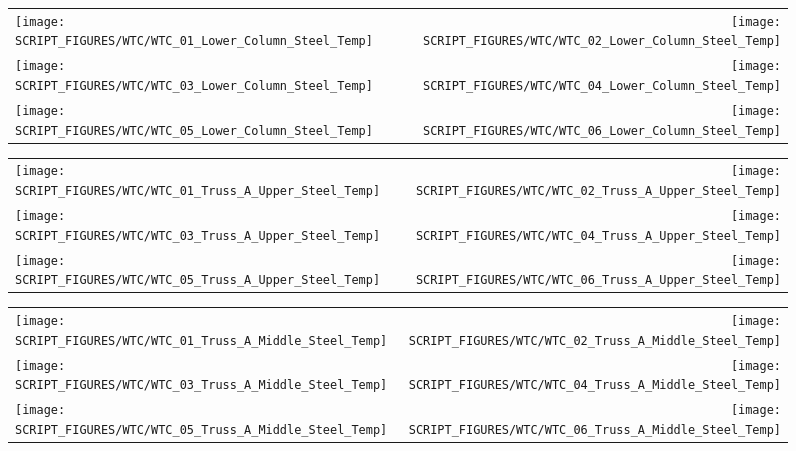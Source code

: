 \begin{figure}[p]
\begin{tabular*}{\textwidth}{l@{\extracolsep{\fill}}r}
\texttt{[image: SCRIPT\_FIGURES/WTC/WTC\_01\_Lower\_Column\_Steel\_Temp]} &
\texttt{[image: SCRIPT\_FIGURES/WTC/WTC\_02\_Lower\_Column\_Steel\_Temp]} \\
\texttt{[image: SCRIPT\_FIGURES/WTC/WTC\_03\_Lower\_Column\_Steel\_Temp]} &
\texttt{[image: SCRIPT\_FIGURES/WTC/WTC\_04\_Lower\_Column\_Steel\_Temp]} \\
\texttt{[image: SCRIPT\_FIGURES/WTC/WTC\_05\_Lower\_Column\_Steel\_Temp]} &
\texttt{[image: SCRIPT\_FIGURES/WTC/WTC\_06\_Lower\_Column\_Steel\_Temp]}
\end{tabular*}
\label{NIST_WTC_Lower_Column_Steel}
\end{figure}

\begin{figure}[p]
\begin{tabular*}{\textwidth}{l@{\extracolsep{\fill}}r}
\texttt{[image: SCRIPT\_FIGURES/WTC/WTC\_01\_Truss\_A\_Upper\_Steel\_Temp]} &
\texttt{[image: SCRIPT\_FIGURES/WTC/WTC\_02\_Truss\_A\_Upper\_Steel\_Temp]} \\
\texttt{[image: SCRIPT\_FIGURES/WTC/WTC\_03\_Truss\_A\_Upper\_Steel\_Temp]} &
\texttt{[image: SCRIPT\_FIGURES/WTC/WTC\_04\_Truss\_A\_Upper\_Steel\_Temp]} \\
\texttt{[image: SCRIPT\_FIGURES/WTC/WTC\_05\_Truss\_A\_Upper\_Steel\_Temp]} &
\texttt{[image: SCRIPT\_FIGURES/WTC/WTC\_06\_Truss\_A\_Upper\_Steel\_Temp]}
\end{tabular*}
\label{NIST_WTC_Truss_A_Upper_Steel_Temp}
\end{figure}

\begin{figure}[p]
\begin{tabular*}{\textwidth}{l@{\extracolsep{\fill}}r}
\texttt{[image: SCRIPT\_FIGURES/WTC/WTC\_01\_Truss\_A\_Middle\_Steel\_Temp]} &
\texttt{[image: SCRIPT\_FIGURES/WTC/WTC\_02\_Truss\_A\_Middle\_Steel\_Temp]} \\
\texttt{[image: SCRIPT\_FIGURES/WTC/WTC\_03\_Truss\_A\_Middle\_Steel\_Temp]} &
\texttt{[image: SCRIPT\_FIGURES/WTC/WTC\_04\_Truss\_A\_Middle\_Steel\_Temp]} \\
\texttt{[image: SCRIPT\_FIGURES/WTC/WTC\_05\_Truss\_A\_Middle\_Steel\_Temp]} &
\texttt{[image: SCRIPT\_FIGURES/WTC/WTC\_06\_Truss\_A\_Middle\_Steel\_Temp]}
\end{tabular*}
\label{NIST_WTC_Truss_A_Middle_Steel_Temp}
\end{figure}

